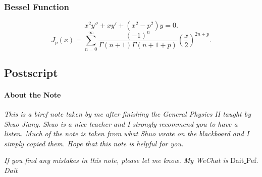 \documentclass{article}
\newcommand{\kh}[1]{\left(#1\right)}
\begin{document}
\subsubsection{Bessel Function}
$$x^2y''+xy'+(x^2-p^2)y=0.$$
$$J_p(x)=\sum_{n=0}^\infty\frac{(-1)^n}{\Gamma(n+1)\Gamma(n+1+p)}\kh{\frac x2}^{2n+p}.$$
\clearpage
\subsection*{Postscript}
\paragraph{About the Note} \textit{This is a biref note taken by me after finishing the General Physics II taught by Shuo Jiang. Shuo is a nice teacher and I strongly recommend you to have a listen. Much of the note is taken from what Shuo wrote on the blackboard and I simply copied them. Hope that this note is helpful for you.}
\par\textit{If you find any mistakes in this note, please let me know. My WeChat is }Dait\underline{ }Pef.
\hfill\textit{Dait}
\printindex
\end{document}
